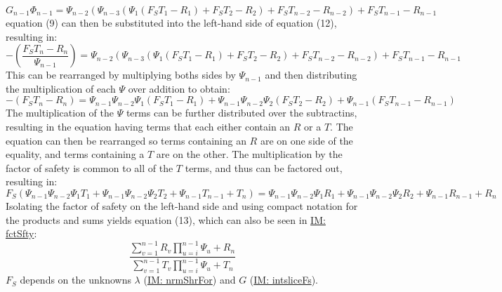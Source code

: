 \documentclass[12pt]{article}
\begin{document}
\begin{displaymath}
G_{n-1} Φ_{n-1}=Ψ_{n-2} \left(Ψ_{n-3} \left(Ψ_{1} \left({F_{S}} T_{1}-R_{1}\right)+{F_{S}} T_{2}-R_{2}\right)+{F_{S}} T_{n-2}-R_{n-2}\right)+{F_{S}} T_{n-1}-R_{n-1}
\end{displaymath}
equation (9) can then be substituted into the left-hand side of equation (12), resulting in:
\begin{displaymath}
-\left(\frac{{F_{S}} T_{n}-R_{n}}{Ψ_{n-1}}\right)=Ψ_{n-2} \left(Ψ_{n-3} \left(Ψ_{1} \left({F_{S}} T_{1}-R_{1}\right)+{F_{S}} T_{2}-R_{2}\right)+{F_{S}} T_{n-2}-R_{n-2}\right)+{F_{S}} T_{n-1}-R_{n-1}
\end{displaymath}
This can be rearranged by multiplying boths sides by $Ψ_{n-1}$ and then distributing the multiplication of each $Ψ$ over addition to obtain:
\begin{displaymath}
-\left({F_{S}} T_{n}-R_{n}\right)=Ψ_{n-1} Ψ_{n-2} Ψ_{1} \left({F_{S}} T_{1}-R_{1}\right)+Ψ_{n-1} Ψ_{n-2} Ψ_{2} \left({F_{S}} T_{2}-R_{2}\right)+Ψ_{n-1} \left({F_{S}} T_{n-1}-R_{n-1}\right)
\end{displaymath}
The multiplication of the $Ψ$ terms can be further distributed over the subtractins, resulting in the equation having terms that each either contain an $R$ or a $T$. The equation can then be rearranged so terms containing an $R$ are on one side of the equality, and terms containing a $T$ are on the other. The multiplication by the factor of safety is common to all of the $T$ terms, and thus can be factored out, resulting in:
\begin{displaymath}
{F_{S}} \left(Ψ_{n-1} Ψ_{n-2} Ψ_{1} T_{1}+Ψ_{n-1} Ψ_{n-2} Ψ_{2} T_{2}+Ψ_{n-1} T_{n-1}+T_{n}\right)=Ψ_{n-1} Ψ_{n-2} Ψ_{1} R_{1}+Ψ_{n-1} Ψ_{n-2} Ψ_{2} R_{2}+Ψ_{n-1} R_{n-1}+R_{n}
\end{displaymath}
Isolating the factor of safety on the left-hand side and using compact notation for the products and sums yields equation (13), which can also be seen in \hyperref[IM:fctSfty]{IM: fctSfty}:
\begin{displaymath}
\frac{\displaystyle\sum_{v=1}^{n-1}{R_{v} \displaystyle\prod_{u=i}^{n-1}{Ψ_{u}}}+R_{n}}{\displaystyle\sum_{v=1}^{n-1}{T_{v} \displaystyle\prod_{u=i}^{n-1}{Ψ_{u}}}+T_{n}}
\end{displaymath}
${F_{S}}$ depends on the unknowns $λ$ (\hyperref[IM:nrmShrFor]{IM: nrmShrFor}) and $G$ (\hyperref[IM:intsliceFs]{IM: intsliceFs}).
~\newline
\end{document}
